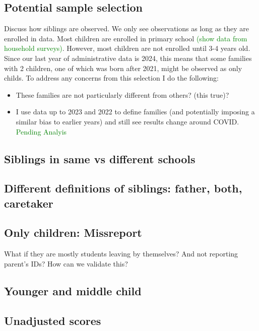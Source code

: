 \subsection{Potential sample selection}

Discuss how siblings are observed. We only see observations as long as they are enrolled in data. Most children are enrolled in primary school \textcolor{green}{(show data from household surveys)}. However, most children are not enrolled until 3-4 years old. Since our last year of administrative data is 2024, this means that some families with 2 children, one of which was born after 2021, might be observed as only childs. To address any concerns from this selection I do the following:

\begin{itemize}
    \item These families are not particularly different from others? (this true)?
    \item I use data up to 2023 and 2022 to define families (and potentially imposing a similar bias to earlier years) and still see results change around COVID. \textcolor{green}{Pending Analyis}
\end{itemize}


\subsection{Siblings in same vs different schools}

\subsection{Different definitions of siblings: father, both, caretaker}

\subsection{Only children: Missreport}

What if they are mostly students leaving by themselves? And not reporting parent's IDs? How can we validate this?

\subsection{Younger and middle child}

\subsection{Unadjusted scores}


